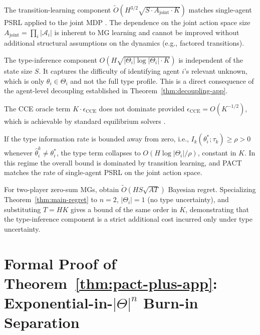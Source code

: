 The transition-learning component $\tilde{O}(H^{3/2}\sqrt{S \cdot A_{\mathrm{joint}} \cdot K})$ matches single-agent PSRL applied to the joint MDP \citep{osband2013more}. The dependence on the joint action space size $A_{\mathrm{joint}} = \prod_i |\mathcal{A}_i|$ is inherent to MG learning and cannot be improved without additional structural assumptions on the dynamics (e.g., factored transitions).

The type-inference component $O(H\sqrt{|\Theta_i| \log|\Theta_i| \cdot K})$ is independent of the state size $S$. It captures the difficulty of identifying agent $i$'s relevant unknown, which is only $\theta_i \in \Theta_i$ and not the full type profile. This is a direct consequence of the agent-level decoupling established in Theorem~\ref{thm:decoupling-app}.

The CCE oracle term $K \cdot \epsilon_{\mathrm{CCE}}$ does not dominate provided $\epsilon_{\mathrm{CCE}} = O(K^{-1/2})$, which is achievable by standard equilibrium solvers \citep{jin2021v}.

\begin{remark}
If the type information rate is bounded away from zero, i.e., $I_k(\theta_i^*; \tau_k) \geq \rho > 0$ whenever $\hat{\theta}_i^k \neq \theta_i^*$, the type term collapses to $O(H \log|\Theta_i| / \rho)$, constant in $K$. In this regime the overall bound is dominated by transition learning, and PACT matches the rate of single-agent PSRL on the joint action space.
\end{remark}

\begin{remark}
For two-player zero-sum MGs, \citet{jafarnia2021learning} obtain $\tilde{O}(HS\sqrt{AT})$ Bayesian regret. Specializing Theorem~\ref{thm:main-regret} to $n=2$, $|\Theta_i| = 1$ (no type uncertainty), and substituting $T = HK$ gives a bound of the same order in $K$, demonstrating that the type-inference component is a strict additional cost incurred only under type uncertainty.
\end{remark}

\section[Formal Proof of the Exponential-in-Theta-n Burn-in Separation Theorem]{Formal Proof of Theorem~\ref{thm:pact-plus-app}: Exponential-in-\texorpdfstring{$|\Theta|^n$}{|Theta|\^n} Burn-in Separation}
\label{app:pact-plus}

